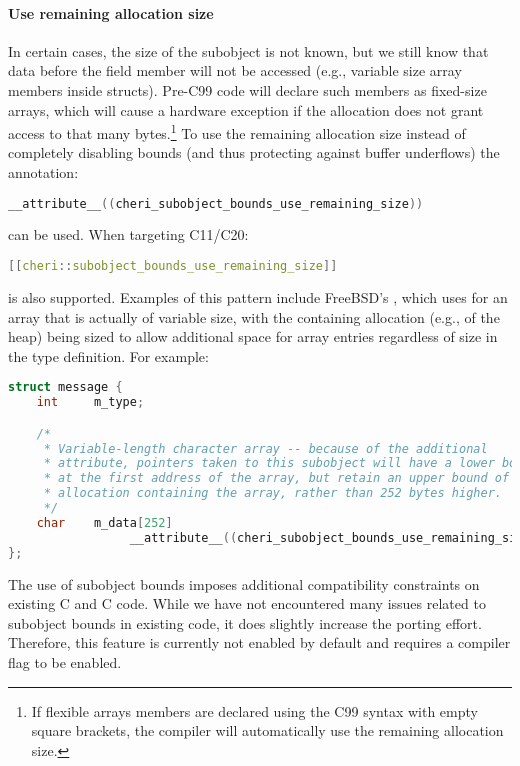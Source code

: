 \documentclass[12pt,twoside,openright,usletter]{article}
\newcommand{\ccode}[1]{{\small\ttfamily{#1}}}
\newcommand*{\cpp}[1][]{C\textsmaller[2]{\nolinebreak[4]\hspace{-.05em}\raisebox{.45ex}{\textbf{++}}}}
\begin{document}
\paragraph{Use remaining allocation size}
In certain cases, the size of the subobject is not known, but we still know that data
before the field member will not be accessed (e.g., variable size array members
inside structs).
Pre-C99 code will declare such members as fixed-size arrays, which will cause
a hardware exception if the allocation does not grant access to that many bytes.\footnote{%
If flexible arrays members are declared using the C99 syntax with empty square
brackets, the compiler will automatically use the remaining allocation size.}
To use the remaining allocation size instead of completely disabling bounds
(and thus protecting against buffer underflows) the annotation:

\begin{lstlisting}[language={C}]
__attribute__((cheri_subobject_bounds_use_remaining_size))
\end{lstlisting}

\noindent
can be used.
When targeting \cpp{}11/C20:

\begin{lstlisting}[language={C++}]
[[cheri::subobject_bounds_use_remaining_size]]
\end{lstlisting}

\noindent
is also supported.
Examples of this pattern include FreeBSD's \ccode{struct dirent}, which uses
\ccode{char d\_name[255]} for an array that is actually of variable size, with
the containing allocation (e.g., of the heap) being sized to allow additional
space for array entries regardless of size in the type definition.
For example:

\begin{lstlisting}[language={C}]
struct message {
    int     m_type;

    /*
     * Variable-length character array -- because of the additional
     * attribute, pointers taken to this subobject will have a lower bound
     * at the first address of the array, but retain an upper bound of the
     * allocation containing the array, rather than 252 bytes higher.
     */
    char    m_data[252]
                 __attribute__((cheri_subobject_bounds_use_remaining_size));
};
\end{lstlisting}

The use of subobject bounds imposes additional compatibility constraints on
existing C and \cpp{} code.
While we have not encountered many issues related to subobject bounds in
existing code, it does slightly increase the porting effort.
Therefore, this feature is currently not enabled by default and requires a
compiler flag to be enabled.
\end{document}
